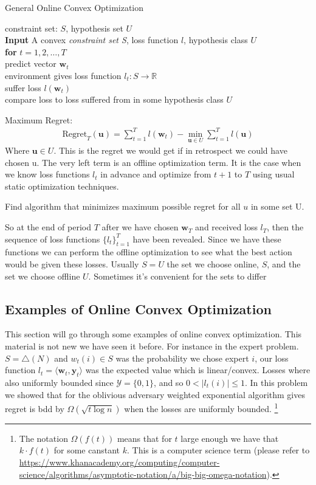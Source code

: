 \documentclass[11pt]{article}
\newcommand\tab[1][1cm]{\hspace*{#1}}
\theoremstyle{quest}
\newcommand{\R}{\mathbb{R}}
\begin{document}
\begin{tcolorbox}
\begin{center}General Online Convex Optimization\end{center}
constraint set: $S$, hypothesis set $U$\\
\textbf{Input} A convex \textit{constraint set S}, loss function $l$, hypothesis class $U$ \\
\textbf{for} $t=1,2 ,\dots, T$\\
\tab predict vector $\mathbf{w}_t$\\
\tab environment gives loss function $l_t:S\rightarrow \R$\\
\tab suffer loss $l(\mathbf{w}_t)$\\
\tab compare loss to loss suffered from in some hypothesis class $U$

Maximum Regret: 
	\begin{align*} 
		\text{Regret}_T(\mathbf{u})= \sum_{t=1}^T l(\mathbf{w}_t) - \min_{\mathbf{u}\in U}\sum_{t=1}^T  l(\mathbf{u})
	\end{align*}
Where $\mathbf{u}\in U$. This is the regret we would get if in retrospect we could have chosen u. The very left term is an offline optimization term. It is the case when we know loss functions $l_t$ in advance and optimize from $t+1 $ to $ T$ using usual static optimization techniques.

Find algorithm that minimizes maximum possible regret for all $u$ in some set U. 
\end{tcolorbox}
So at the end of period $T$ after we have chosen $\mathbf{w}_T$ and received loss $l_T$, then the sequence of loss functions  $\{l_t\}_{t=1}^{T}$ have been revealed. Since we have these functions we can perform the offline optimization to see what the best action would be given these losses.
Usually $S=U$ the set we choose online, $S$, and the set we choose offline $U$. Sometimes it's convenient for the sets to differ
\subsection{Examples of Online Convex Optimization}
This section will go through some examples of online convex optimization. This material is not new we have seen it before. For instance in the expert problem. $S = \triangle(N)$ and $w_t(i)\in S$ was the probability we chose expert $i$, our loss function $l_t = \langle \mathbf{w}_t, \mathbf{y}_t \rangle$ was the expected value which is linear/convex. Losses where also uniformly bounded since $\mathcal{Y}=\{0,1\}$, and so $0<|l_t(i)|\le 1$. In this problem we showed that for the oblivious adversary weighted exponential algorithm gives regret is bdd by $\Omega(\sqrt{t \log n})$ when the losses are uniformly bounded. \footnote{The notation $\Omega(f(t))$ means that for $t$ large enough we have that $k\cdot f(t)$ for some canstant $k$. This is a computer science term (please refer to \url{https://www.khanacademy.org/computing/computer-science/algorithms/asymptotic-notation/a/big-big-omega-notation}).}
\end{document}
